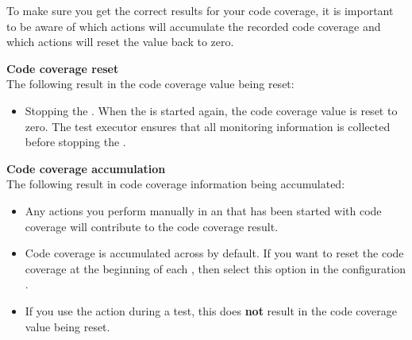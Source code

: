 To make sure you get the correct results for your code coverage, it is important to be aware of which actions will accumulate the recorded code coverage and which actions will reset the value back to zero. 


\textbf{Code coverage reset}\\

The following result in the code coverage value being reset:

\begin{itemize}
\item Stopping the \gdaut{}. When the \gdaut{} is started again, the code coverage value is reset to zero. The test executor ensures that all monitoring information is collected before stopping the \gdaut{}. 
\end{itemize}


\textbf{Code coverage accumulation}\\
The following result in code coverage information being accumulated:

\begin{itemize}
\item Any actions you perform manually in an \gdaut{} that has been started with code coverage will contribute to the code coverage result.
\item Code coverage is accumulated across \gdsuites{} by default. If you want to reset the code coverage at the beginning of each \gdsuite{}, then select this option in the \gdaut{} configuration .
\item If you use the  action during a test, this does \textbf{not} result in the code coverage value being reset.
\end{itemize}

